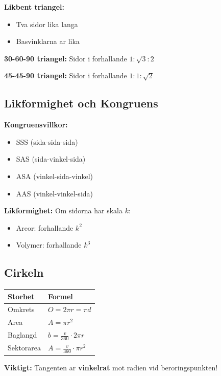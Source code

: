 \documentclass[11pt,a4paper]{article}
\newenvironment{formelbox}{\begin{framed}\color{mainblue}}{\end{framed}}
\begin{document}
\textbf{Likbent triangel:}
\begin{itemize}
\item Tva sidor lika langa
\item Basvinklarna ar lika
\end{itemize}

\textbf{30-60-90 triangel:} Sidor i forhallande $1 : \sqrt{3} : 2$

\textbf{45-45-90 triangel:} Sidor i forhallande $1 : 1 : \sqrt{2}$

\subsection{Likformighet och Kongruens}

\textbf{Kongruensvillkor:}
\begin{itemize}
\item SSS (sida-sida-sida)
\item SAS (sida-vinkel-sida)
\item ASA (vinkel-sida-vinkel)
\item AAS (vinkel-vinkel-sida)
\end{itemize}

\textbf{Likformighet:} Om sidorna har skala $k$:
\begin{itemize}
\item Areor: forhallande $k^2$
\item Volymer: forhallande $k^3$
\end{itemize}

\subsection{Cirkeln}

\begin{tabular}{|l|l|}
\hline
\textbf{Storhet} & \textbf{Formel} \\
\hline
Omkrets & $O = 2\pi r = \pi d$ \\
Area & $A = \pi r^2$ \\
Baglangd & $b = \frac{v}{360} \cdot 2\pi r$ \\
Sektorarea & $A = \frac{v}{360} \cdot \pi r^2$ \\
\hline
\end{tabular}

\begin{formelbox}
\textbf{Viktigt:} Tangenten ar \textbf{vinkelrat} mot radien vid beroringspunkten!
\end{formelbox}
\end{document}
